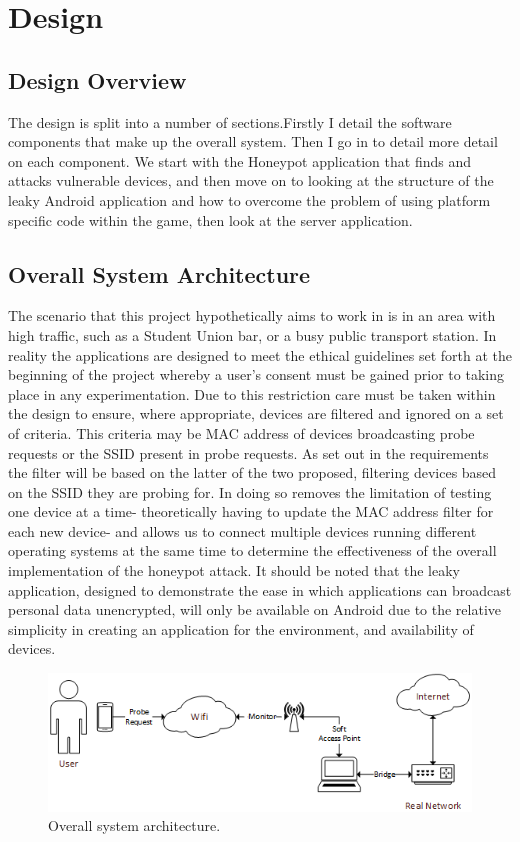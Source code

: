 \section{Design}
\subsection{Design Overview}
The design is split into a number of sections.Firstly I detail the software components that make up the overall system. Then I go in to detail more detail on each component. We start with the Honeypot application that finds and attacks vulnerable devices, and then move on to looking at the structure of the leaky Android application and how to overcome the problem of using platform specific code within the game, then look at the server application. 
\subsection{Overall System Architecture}
The scenario that this project hypothetically aims to work in is in an area with high traffic, such as a Student Union bar, or a busy public transport station. In reality the applications are designed to meet the ethical guidelines set forth at the beginning of the project whereby a user's consent must be gained prior to taking place in any experimentation. Due to this restriction care must be taken within the design to ensure, where appropriate, devices are filtered and ignored on a set of criteria. This criteria may be MAC address of devices broadcasting probe requests or the SSID present in probe requests. As set out in the requirements the filter will be based on the latter of the two proposed, filtering devices based on the SSID they are probing for. In doing so removes the limitation of testing one device at a time- theoretically having to update the MAC address filter for each new device- and allows us to connect multiple devices running different operating systems at the same time to determine the effectiveness of the overall implementation of the honeypot attack. It should be noted that the leaky application, designed to demonstrate the ease in which applications can broadcast personal data unencrypted, will only be available on Android due to the relative simplicity in creating an application for the environment, and availability of devices. 

\begin{figure}[h!]
\centering\includegraphics[width=\linewidth]{design/figures/overall.png}
\caption{Overall system architecture.}
\end{figure}

